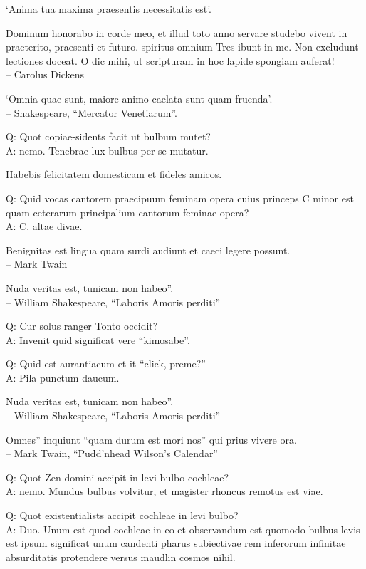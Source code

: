 \documentclass[titlepage,12pt]{memoir}
\begin{document}
‘Anima tua maxima praesentis necessitatis est’.

Dominum honorabo in corde meo, et illud toto anno servare studebo
vivent in praeterito, praesenti et futuro. spiritus omnium
Tres ibunt in me. Non excludunt lectiones
doceat. O dic mihi, ut scripturam in hoc lapide spongiam auferat!
\\-- Carolus Dickens

‘Omnia quae sunt, maiore animo caelata sunt quam fruenda’.
\\-- Shakespeare, “Mercator Venetiarum”.

Q: Quot copiae-sidents facit ut bulbum mutet?\\
A: nemo. Tenebrae lux bulbus per se mutatur.

 Habebis felicitatem domesticam et fideles amicos.

Q: Quid vocas cantorem praecipuum feminam opera cuius princeps C
minor est quam ceterarum principalium cantorum feminae opera?\\
A: C. altae divae.

 Benignitas est lingua quam surdi audiunt et caeci legere possunt.
\\-- Mark Twain

Nuda veritas est, tunicam non habeo”.
\\-- William Shakespeare, “Laboris Amoris perditi”

Q: Cur solus ranger Tonto occidit?\\
A: Invenit quid significat vere “kimosabe”.

Q: Quid est aurantiacum et it “click, preme?”\\
A: Pila punctum daucum.

Nuda veritas est, tunicam non habeo”.
\\-- William Shakespeare, “Laboris Amoris perditi”

Omnes” inquiunt “quam durum est mori nos”
qui prius vivere ora.
\\-- Mark Twain, “Pudd’nhead Wilson’s Calendar”

Q: Quot Zen domini accipit in levi bulbo cochleae?\\
A: nemo. Mundus bulbus volvitur, et magister rhoncus remotus est
viae.

Q: Quot existentialists accipit cochleae in levi bulbo?\\
A: Duo. Unum est quod cochleae in eo et observandum est quomodo bulbus levis est
ipsum significat unum candenti pharus subiectivae
rem inferorum infinitae absurditatis protendere versus
maudlin cosmos nihil.
\end{document}
